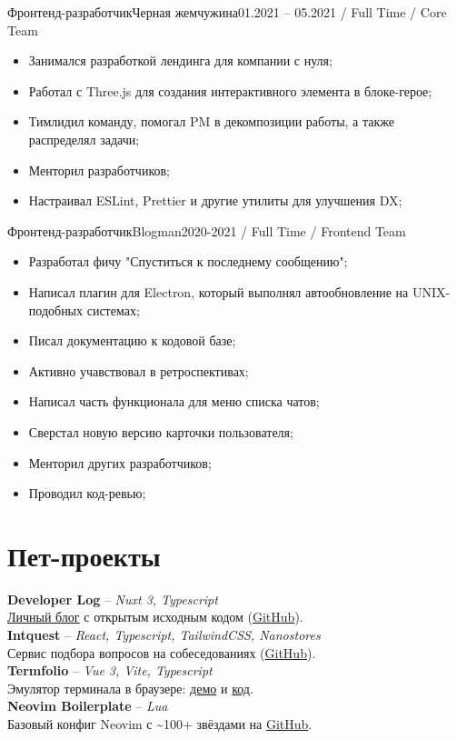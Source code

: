 \documentclass[a4paper,12pt]{article}
\newcommand{\ProjectEntry}[3]{%
  \textbf{#1} -- \emph{#2}\\
  #3\\
}
\begin{document}
\begin{minipage}[t]{1\textwidth}
\begin{ExperienceBlock}{Фронтенд-разработчик}{Черная жемчужина}{01.2021 -- 05.2021 / Full Time / Core Team}
  \begin{itemize}[leftmargin=*]
    \item Занимался разработкой лендинга для компании с нуля;
    \item Работал с Three.js для создания интерактивного элемента в блоке-герое;
    \item Тимлидил команду, помогал PM в декомпозиции работы, а также распределял задачи;
    \item Менторил разработчиков;
    \item Настраивал ESLint, Prettier и другие утилиты для улучшения DX;
  \end{itemize}
\end{ExperienceBlock}

\begin{ExperienceBlock}{Фронтенд-разработчик}{Blogman}{2020-2021 / Full Time / Frontend Team}
  \begin{itemize}[leftmargin=*]
    \item Разработал фичу "Спуститься к последнему сообщению";
    \item Написал плагин для Electron, который выполнял автообновление на UNIX-подобных системах;
    \item Писал документацию к кодовой базе;
    \item Активно учавствовал в ретроспективах;
    \item Написал часть функционала для меню списка чатов;
    \item Сверстал новую версию карточки пользователя;
    \item Менторил других разработчиков;
    \item Проводил код-ревью;
  \end{itemize}
\end{ExperienceBlock}
\end{minipage}
\begin{minipage}[t]{1\textwidth}
\section*{Пет-проекты}

 \ProjectEntry{Developer Log}{Nuxt 3, Typescript}{\href{https://developer-log.vercel.app/}{Личный блог} с открытым исходным кодом (\href{https://github.com/tokiory/developer-log}{GitHub}).}

  \ProjectEntry{Intquest}{React, Typescript, TailwindCSS, Nanostores}{Сервис подбора вопросов на собеседованиях (\href{https://github.com/tokiory/intquest}{GitHub}).}

  \ProjectEntry{Termfolio}{Vue 3, Vite, Typescript}{Эмулятор терминала в браузере: \href{https://tokiory.vercel.app/}{демо} и \href{https://github.com/tokiory/termfolio}{код}.}

  \ProjectEntry{Neovim Boilerplate}{Lua}{Базовый конфиг Neovim с \textasciitilde100+ звёздами на \href{https://github.com/tokiory/neovim-boilerplate}{GitHub}.}

\end{minipage}
\end{document}
